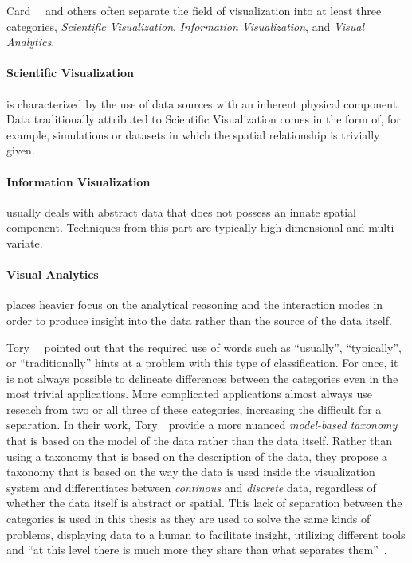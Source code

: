 Card~\etal~\cite{card1999readings} and others often separate the field of visualization into at least three categories, \emph{Scientific Visualization}, \emph{Information Visualization}, and \emph{Visual Analytics}.

\paragraph{Scientific Visualization} is characterized by the use of data sources with an inherent physical component.  Data traditionally attributed to Scientific Visualization comes in the form of, for example, simulations or datasets in which the spatial relationship is trivially given.

\paragraph{Information Visualization} usually deals with abstract data that does not possess an innate spatial component.  Techniques from this part are typically high-dimensional and multi-variate.

\paragraph{Visual Analytics} places heavier focus on the analytical reasoning and the interaction modes in order to produce insight into the data rather than the source of the data itself.

Tory~\etal~\cite{tory2002model} pointed out that the required use of words such as ``usually'', ``typically'', or ``traditionally'' hints at a problem with this type of classification.  For once, it is not always possible to delineate differences between the categories even in the most trivial applications.  More complicated applications almost always use reseach from two or all three of these categories, increasing the difficult for a separation.  In their work, Tory~\etal~provide a more nuanced \emph{model-based taxonomy} that is based on the model of the data rather than the data itself.  Rather than using a taxonomy that is based on the description of the data, they propose a taxonomy that is based on the way the data is used inside the visualization system and differentiates between \emph{continous} and \emph{discrete} data, regardless of whether the data itself is abstract or spatial.  This lack of separation between the categories is used in this thesis as they are used to solve the same kinds of problems, displaying data to a human to facilitate insight, utilizing different tools and ``at this level there is much more they share than what separates them''~\cite{van2005value}.

